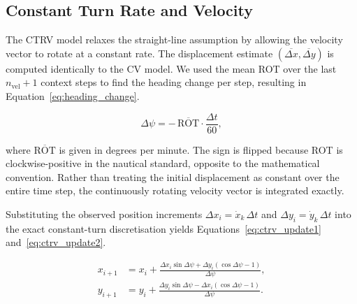    
    \subsection{Constant Turn Rate and Velocity}
    \label{sec:method-ctrv}
    

    The \ac{CTRV} model relaxes the straight-line assumption by allowing the
    velocity vector to rotate at a constant rate. The displacement estimate
    $(\overline{\Delta x}, \overline{\Delta y})$ is computed identically to
    the \ac{CV} model. 
    We used the mean \acf{ROT} over the last
    $n_\text{vel} + 1$ context steps to find the heading change per step, resulting in Equation~\ref{eq:heading_change}. 
    
    \begin{equation}
        \Delta\psi = -\,\overline{\text{ROT}} \cdot \frac{\Delta t}{60},
        \label{eq:heading_change}
    \end{equation}
    
    where $\overline{\text{ROT}}$ is given in degrees per minute. The sign is
    flipped because \ac{ROT} is clockwise-positive in the nautical standard,
    opposite to the mathematical convention. %
    Rather than treating the initial displacement as constant over the entire time step, the continuously rotating velocity vector is integrated exactly. %
    
    Substituting the observed position increments $\Delta x_i = \dot{x}_k\,\Delta t$ and 
    $\Delta y_i = \dot{y}_k\,\Delta t$ into the exact constant-turn
    discretisation \parencite[Eq.~62, p.~1346]{li2003survey} yields Equations~\ref{eq:ctrv_update1} and~\ref{eq:ctrv_update2}.
    
    \begin{align}
        x_{i+1} &= x_i + \frac{\Delta x_i \sin\Delta\psi + \Delta y_i(\cos\Delta\psi - 1)}{\Delta\psi}, \label{eq:ctrv_update1} \\
        y_{i+1} &= y_i + \frac{\Delta y_i \sin\Delta\psi - \Delta x_i(\cos\Delta\psi - 1)}{\Delta\psi}. \label{eq:ctrv_update2}
    \end{align}
    
    
